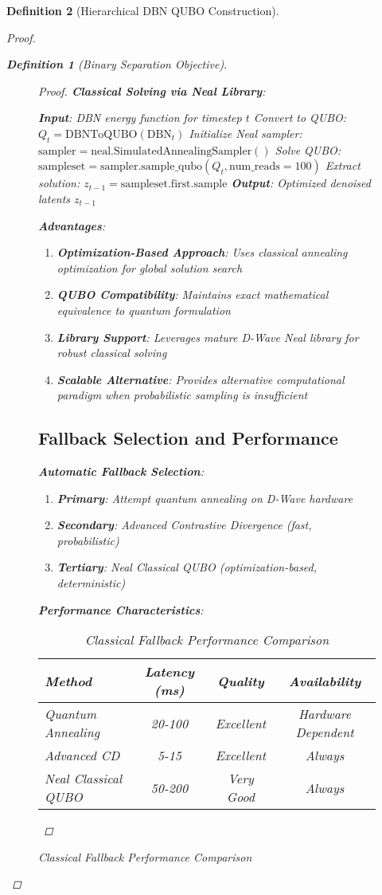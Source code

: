 \documentclass{article}
\newtheorem{definition}{Definition}
\begin{document}
\begin{definition}[Hierarchical DBN QUBO Construction]
\begin{proof}
\begin{definition}[Binary Separation Objective]
\begin{figure}[H]
\begin{proof}
\textbf{Classical Solving via Neal Library}:
\begin{algorithm}
\caption{Neal Classical QUBO Solver (Alternative Fallback)}
\begin{algorithmic}[1]
\STATE \textbf{Input}: DBN energy function for timestep $t$
\STATE Convert to QUBO: $Q_t = \text{DBNToQUBO}(\text{DBN}_t)$
\STATE Initialize Neal sampler: $\text{sampler} = \text{neal.SimulatedAnnealingSampler}()$
\STATE Solve QUBO: $\text{sampleset} = \text{sampler.sample\_qubo}(Q_t, \text{num\_reads}=100)$
\STATE Extract solution: $z_{t-1} = \text{sampleset.first.sample}$
\STATE \textbf{Output}: Optimized denoised latents $z_{t-1}$
\end{algorithmic}
\end{algorithm}

\textbf{Advantages}:
\begin{enumerate}
\item \textbf{Optimization-Based Approach}: Uses classical annealing optimization for global solution search
\item \textbf{QUBO Compatibility}: Maintains exact mathematical equivalence to quantum formulation
\item \textbf{Library Support}: Leverages mature D-Wave Neal library for robust classical solving
\item \textbf{Scalable Alternative}: Provides alternative computational paradigm when probabilistic sampling is insufficient
\end{enumerate}

\subsection{Fallback Selection and Performance}

\textbf{Automatic Fallback Selection}:
\begin{enumerate}
\item \textbf{Primary}: Attempt quantum annealing on D-Wave hardware
\item \textbf{Secondary}: Advanced Contrastive Divergence (fast, probabilistic)
\item \textbf{Tertiary}: Neal Classical QUBO (optimization-based, deterministic)
\end{enumerate}

\textbf{Performance Characteristics}:
\begin{table}[H]
\centering
\caption{Classical Fallback Performance Comparison}
\begin{tabular}{|l|c|c|c|}
\hline
\textbf{Method} & \textbf{Latency (ms)} & \textbf{Quality} & \textbf{Availability} \\
\hline
Quantum Annealing & 20-100 & Excellent & Hardware Dependent \\
Advanced CD & 5-15 & Excellent & Always \\
Neal Classical QUBO & 50-200 & Very Good & Always \\
\hline
\end{tabular}
\end{table}


\end{proof}
\end{figure}
\end{definition}
\end{proof}
\end{definition}
\end{document}
